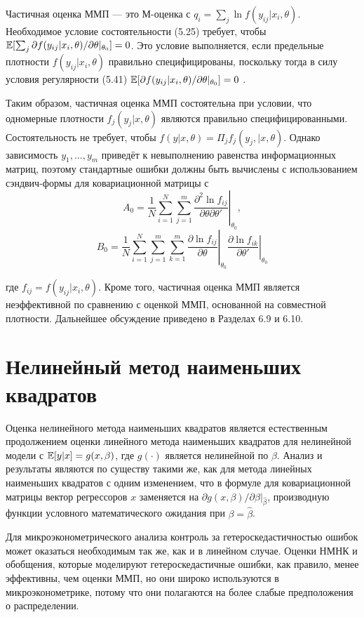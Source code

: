 Частичная оценка ММП --- это М-оценка с $q_i=\sum_j \ln f(y_{ij}|x_i,\theta)$. Необходимое условие состоятельности (5.25) требует, чтобы $\mathbb{E}[\sum_j \partial f(y_{ij}|x_i,\theta) / \partial \theta|_{\theta_0}]=0$. Это условие выполняется, если предельные плотности $f(y_{ij}|x_i,\theta)$ правильно специфицированы, поскольку тогда в силу условия регулярности (5.41) $\mathbb{E}[ \partial f(y_{ij}|x_i,\theta)/ \partial \theta|_{\theta_0}]=0$ .

Таким образом, частичная оценка ММП состоятельна при условии, что одномерные плотности $f_j(y_j|x,\theta)$ являются правильно специфицированными. Состоятельность не требует, чтобы  $f(y|x,\theta)= \Pi_j f_j(y_j,|x,\theta)$. Однако зависимость $y_1, \dots, y_m$  приведёт к невыполнению равенства информационных матриц, поэтому стандартные ошибки должны быть вычислены с использованием сэндвич-формы для ковариационной матрицы с
\begin{equation}
A_0= \left. \frac{1}{N} \sum_{i=1}^{N} \sum_{j=1}^{m} \frac{\partial^2 \ln  f_{ij}}{ \partial \theta \partial \theta'} \right|_{\theta_0}, 
\end{equation}
\[
B_0= \left. \frac{1}{N} \sum_{i=1}^{N} \sum_{j=1}^{m} \sum_{k=1}^{m} \frac{\partial \ln  f_{ij}}{\partial \theta} \right|_{\theta_0} \left. \frac{\partial \ln  f_{ik}}{\partial \theta'} \right|_{\theta_0} 
\]

где $f_{ij}=f(y_{ij}|x_i,\theta)$. Кроме того, частичная оценка ММП является неэффективной по сравнению с оценкой ММП, основанной на совместной плотности. Дальнейшее обсуждение приведено в Разделах 6.9 и 6.10.

\section{Нелинейный метод наименьших квадратов}

Оценка нелинейного метода наименьших квадратов является естественным продолжением оценки линейного метода наименьших квадратов для нелинейной модели с $\mathbb{E}[y|x]=g(x,\beta)$, где $g(\cdot)$ является нелинейной по $\beta$. Анализ и результаты являются по существу такими же, как для метода линейных наименьших квадратов с одним изменением, что в формуле для ковариационной матрицы вектор регрессоров $x$ заменяется на $\partial g(x,\beta)/ \partial \beta|_{\hat{\beta}}$, производную функции условного математического ожидания при $\beta=\hat{\beta}$.

Для микроэконометрического анализа контроль за гетероскедастичностью ошибок может оказаться необходимым так же, как и в линейном случае. Оценки НМНК и обобщения, которые моделируют гетероскедастичные ошибки, как правило, менее эффективны, чем оценки ММП, но они широко используются в микроэконометрике, потому что они полагаются на более слабые предположения о распределении.

